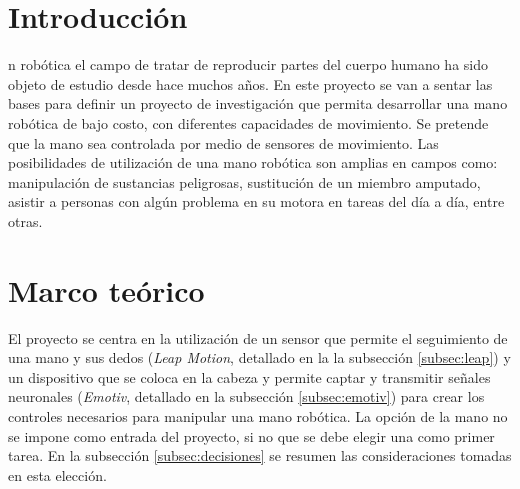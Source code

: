 \documentclass[letterpaper,journal,transmag]{IEEEtran}
\begin{document}
%
\IEEEpeerreviewmaketitle



\section{Introducción}
n robótica el campo de tratar de reproducir partes del
cuerpo humano ha sido objeto de estudio desde hace muchos años. En este proyecto
se van a sentar las bases para definir un proyecto de investigación que permita
desarrollar una mano robótica de bajo costo, con diferentes capacidades de
movimiento. Se pretende que la mano sea controlada por medio de sensores de
movimiento. Las posibilidades de utilización de una mano robótica son amplias en
campos como: manipulación de sustancias peligrosas, sustitución de un miembro
amputado, asistir a personas con algún problema en su motora en tareas del día
a día, entre otras.


\section{Marco teórico}

El proyecto se centra en la utilización de un sensor que permite el seguimiento
de una mano y sus dedos (\emph{Leap Motion}, detallado en la la subsección
\ref{subsec:leap}) y un dispositivo que se coloca en la cabeza y permite captar
y transmitir señales neuronales (\emph{Emotiv}, detallado en la subsección
\ref{subsec:emotiv})
para crear los controles necesarios para manipular una mano robótica. La opción
de la mano no se impone como entrada del proyecto, si no que se debe elegir una
como primer tarea. En la subsección \ref{subsec:decisiones} se resumen las
consideraciones tomadas en esta elección.
\end{document}
